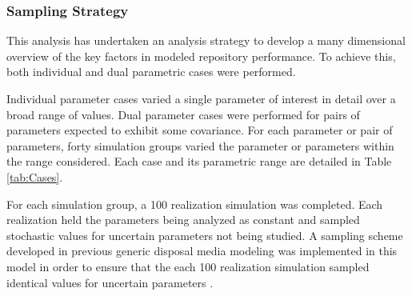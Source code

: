 \begin{frame}[c]
  \frametitle{Sampling Strategy}
This analysis has undertaken an analysis strategy to develop a many dimensional 
overview of the key factors in modeled repository performance. To achieve this, 
both individual and dual parametric cases were performed.

Individual parameter cases varied a single parameter of interest in 
detail over a broad range of values. Dual parameter cases were 
performed for pairs of parameters expected to exhibit some covariance. For 
each parameter or pair of parameters, forty simulation 
groups varied the parameter or parameters within the range considered. Each 
case and its parametric range are detailed in Table \ref{tab:Cases}. 



For each simulation group, a 100 realization simulation was completed. Each
realization held the parameters being analyzed as constant and sampled 
stochastic values for uncertain parameters not being studied.  A sampling scheme 
developed in previous generic disposal media modeling was implemented in this 
model in order to ensure that the each 100 realization simulation sampled 
identical values for uncertain parameters \cite{clayton_generic_2011, 
nutt_generic_2009}.  

\end{frame}
